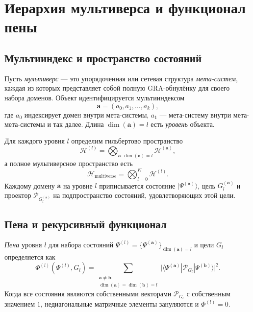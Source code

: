\documentclass[12pt,a4paper]{article}
\newcommand{\pG}{\mathcal{P}_{G}}
\newcommand{\HH}{\mathcal{H}}
\begin{document}
\section{Иерархия мультиверса и функционал пены}

\subsection{Мультииндекс и пространство состояний}
Пусть \emph{мультиверс} — это упорядоченная или сетевая структура \emph{мета-систем}, каждая из которых представляет собой полную GRA-обнулёнку для своего набора доменов. Объект идентифицируется мультииндексом
\begin{equation}
\mathbf{a} = (a_0, a_1, \dots, a_k),
\end{equation}
где $a_0$ индексирует домен внутри мета-системы, $a_1$ — мета-систему внутри мета-мета-системы и так далее. Длина $\dim(\mathbf{a})=l$ есть \emph{уровень} объекта.

Для каждого уровня $l$ определим гильбертово пространство
\begin{equation}
\HH^{(l)} = \bigotimes_{\mathbf{a}: \dim(\mathbf{a}) = l} \HH^{(\mathbf{a})},
\end{equation}
а полное мультиверсное пространство есть
\begin{equation}
\HH_{\text{multiverse}} = \bigotimes_{l=0}^{K} \HH^{(l)}.
\end{equation}
Каждому домену $\mathbf{a}$ на уровне $l$ приписывается состояние $|\Psi^{(\mathbf{a})}\rangle$, цель $G_l^{(\mathbf{a})}$ и проектор $\pG_l^{(\mathbf{a})}$ на подпространство состояний, удовлетворяющих этой цели.

\subsection{Пена и рекурсивный функционал}
\emph{Пена} уровня $l$ для набора состояний $\Psi^{(l)} = \{\Psi^{(\mathbf{a})}\}_{\dim(\mathbf{a})=l}$ и цели $G_l$ определяется как
\begin{equation}\label{eq:foam}
\Phi^{(l)}(\Psi^{(l)}, G_l) = \sum_{\substack{\mathbf{a}\neq\mathbf{b}\\ \dim(\mathbf{a})=\dim(\mathbf{b})=l}} 
\bigl| \langle \Psi^{(\mathbf{a})} | \pG_l | \Psi^{(\mathbf{b})} \rangle \bigr|^2.
\end{equation}
Когда все состояния являются собственными векторами $\pG_l$ с собственным значением $1$, недиагональные матричные элементы зануляются и $\Phi^{(l)}=0$.
\end{document}
